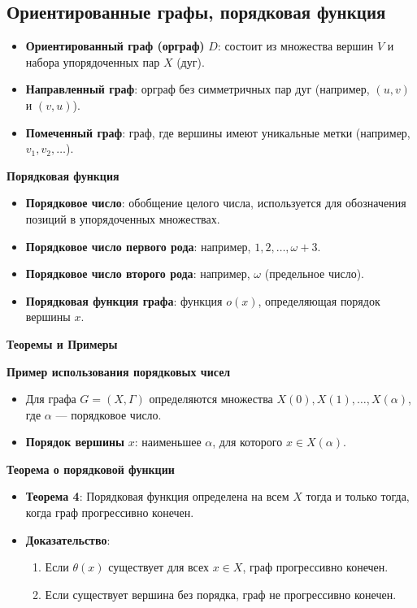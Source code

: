 \subsection{Ориентированные графы, порядковая функция}

\begin{itemize}
    \item \textbf{Ориентированный граф (орграф)} $D$: состоит из множества вершин $V$ и набора упорядоченных пар $X$ (дуг).
    \item \textbf{Направленный граф}: орграф без симметричных пар дуг (например, $(u, v)$ и $(v, u)$).
    \item \textbf{Помеченный граф}: граф, где вершины имеют уникальные метки (например, $v_1, v_2, \ldots$).
\end{itemize}

\textbf{Порядковая функция}
\begin{itemize}
    \item \textbf{Порядковое число}: обобщение целого числа, используется для обозначения позиций в упорядоченных множествах.
    \item \textbf{Порядковое число первого рода}: например, $1, 2, \ldots, \omega + 3$.
    \item \textbf{Порядковое число второго рода}: например, $\omega$ (предельное число).
    \item \textbf{Порядковая функция графа}: функция $o(x)$, определяющая порядок вершины $x$.
\end{itemize}

\textbf{Теоремы и Примеры}

\textbf{Пример использования порядковых чисел}
\begin{itemize}
    \item Для графа $G = (X, \Gamma)$ определяются множества $X(0), X(1), \ldots, X(\alpha)$, где $\alpha$ — порядковое число.
    \item \textbf{Порядок вершины} $x$: наименьшее $\alpha$, для которого $x \in X(\alpha)$.
\end{itemize}

\textbf{Теорема о порядковой функции}
\begin{itemize}
    \item \textbf{Теорема 4}: Порядковая функция определена на всем $X$ тогда и только тогда, когда граф прогрессивно конечен.
    \item \textbf{Доказательство}: 
    \begin{enumerate}
        \item Если $\theta(x)$ существует для всех $x \in X$, граф прогрессивно конечен.
        \item Если существует вершина без порядка, граф не прогрессивно конечен.
    \end{enumerate}
\end{itemize}